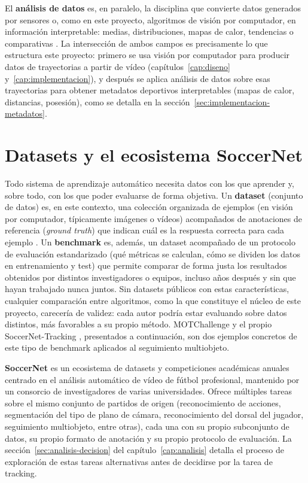 El \textbf{análisis de datos} es, en paralelo, la disciplina que convierte
datos generados por sensores o, como en este proyecto,
algoritmos de visión por computador, en información interpretable: medias,
distribuciones, mapas de calor, tendencias o comparativas
\citep{coursera2026dataanalysis}. La intersección
de ambos campos es precisamente lo que estructura este proyecto: primero se
usa visión por computador para producir datos de trayectorias a partir de
vídeo (capítulos~\ref{cap:diseno} y~\ref{cap:implementacion}), y después se
aplica análisis de datos sobre esas trayectorias para obtener metadatos
deportivos interpretables (mapas de calor, distancias, posesión), como se
detalla en la sección~\ref{sec:implementacion-metadatos}.

\section{Datasets y el ecosistema SoccerNet}
\label{sec:fundamentos-dataset}

Todo sistema de aprendizaje automático necesita datos con los que aprender
y, sobre todo, con los que poder evaluarse de forma objetiva. Un
\textbf{dataset} (conjunto de datos) es, en este contexto, una colección
organizada de ejemplos (en visión por computador, típicamente imágenes o
vídeos) acompañados de anotaciones de referencia (\emph{ground truth}) que
indican cuál es la respuesta correcta para cada ejemplo
\citep{ibm2026dataset}. Un
\textbf{benchmark} es, además, un dataset acompañado de un protocolo de
evaluación estandarizado (qué métricas se calculan, cómo se dividen los
datos en entrenamiento y test) que permite comparar de forma justa los
resultados obtenidos por distintos investigadores o equipos, incluso años
después y sin que hayan trabajado nunca juntos. Sin datasets públicos con
estas características, cualquier comparación entre algoritmos, como la que
constituye el núcleo de este proyecto, carecería de validez: cada autor
podría estar evaluando sobre datos distintos, más favorables a su propio
método. MOTChallenge \citep{motchallengeweb2026} y el propio
SoccerNet-Tracking \citep{cioppa2022soccernettracking}, presentados a
continuación, son dos ejemplos concretos de este tipo de benchmark
aplicados al seguimiento multiobjeto.

\textbf{SoccerNet} \citep{soccernetweb2026} es un
ecosistema de datasets y competiciones académicas anuales centrado en el
análisis automático de vídeo de fútbol profesional, mantenido por un
consorcio de investigadores de varias universidades. Ofrece múltiples
tareas sobre el mismo conjunto de partidos de origen (reconocimiento de
acciones, segmentación del tipo de plano de cámara, reconocimiento del
dorsal del jugador, seguimiento multiobjeto, entre otras), cada una con su
propio subconjunto de datos, su propio formato de anotación y su propio
protocolo de evaluación. La sección~\ref{sec:analisis-decision} del
capítulo~\ref{cap:analisis} detalla el proceso de exploración de estas
tareas alternativas antes de decidirse por la tarea de tracking.

